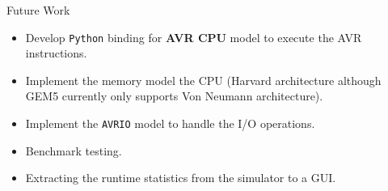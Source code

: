 \begin{frame}{Future Work}
    \begin{itemize}
      \item Develop \texttt{Python} binding for \textbf{AVR CPU} model to execute the AVR instructions.
      \item Implement the memory model the CPU (Harvard architecture although GEM5 currently only supports Von Neumann architecture).
      \item Implement the \texttt{AVRIO} model to handle the I/O operations.
      \item Benchmark testing.
      \item Extracting the runtime statistics from the simulator to a GUI.
    \end{itemize}
  \end{frame}
  